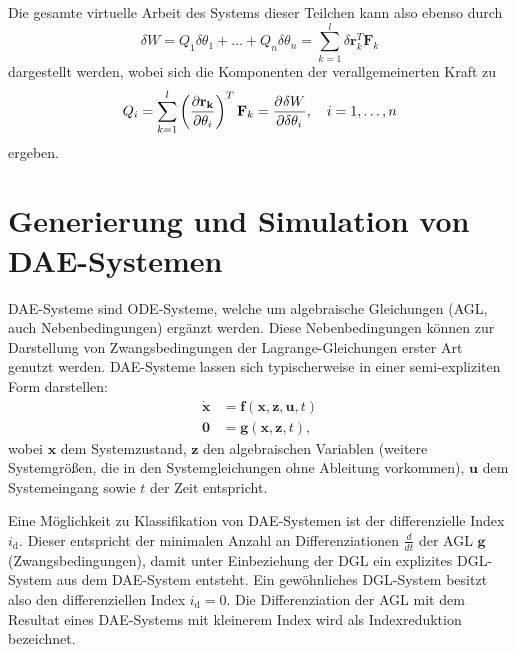 Die gesamte virtuelle Arbeit des Systems dieser Teilchen kann also ebenso durch
\begin{equation}
\label{eq:virtual_work}
\delta W = Q_1 \delta \theta_1 + \ldots + Q_n\delta \theta_n = \sum_{k=1}^{l}\delta \mathbf{r}_k^T \mathbf{F}_k
\end{equation}
dargestellt werden, wobei sich die Komponenten der verallgemeinerten Kraft zu
\begin{equation}
\label{eq:virtual_work_force}
Q_i = \sum_{k=1}^l \left(\frac {\partial \mathbf{r_k}} {\partial \theta_i} \right)^T \mathbf {F}_{k} = \frac{\partial^{}\delta W}{\partial{\delta \theta_i}^{}} ,\quad i=1,\ldots, n 
\end{equation}
ergeben.
\section{Generierung und Simulation von DAE-Systemen}
DAE-Systeme sind ODE-Systeme, welche um algebraische Gleichungen (AGL, auch Nebenbedingungen) ergänzt werden. Diese Nebenbedingungen können zur Darstellung von Zwangsbedingungen der Lagrange-Gleichungen erster Art genutzt werden. DAE-Systeme lassen sich typischerweise in einer semi-expliziten Form darstellen:
	\begin{align}\label{eq:dae_std}
		\mathbf{\dot{x}} &= \mathbf{f}(\mathbf{x}, \mathbf{z}, \mathbf{u}, t) \\
		\mathbf{0} &= \mathbf{g}(\mathbf{x}, \mathbf{z}, t),
	\end{align}
wobei $\mathbf{x}$ dem Systemzustand, $\mathbf{z}$ den algebraischen Variablen (weitere Systemgrößen, die in den Systemgleichungen ohne Ableitung vorkommen), $\mathbf{u}$ dem Systemeingang sowie $t$ der Zeit entspricht. \cite[S.137]{JanschekSystementwurf}

Eine Möglichkeit zu Klassifikation von DAE-Systemen ist der differenzielle Index $i_\mathrm{d}$. Dieser entspricht der minimalen Anzahl an Differenziationen $\frac{d}{dt}$ der AGL $\mathbf{g}$ (Zwangsbedingungen), damit unter Einbeziehung der DGL ein explizites DGL-System aus dem DAE-System entsteht. Ein gewöhnliches DGL-System besitzt also den differenziellen Index $i_\mathrm{d} = 0$. Die Differenziation der AGL mit dem Resultat eines DAE-Systems mit kleinerem Index wird als Indexreduktion bezeichnet. \cite[S.139]{JanschekSystementwurf}

